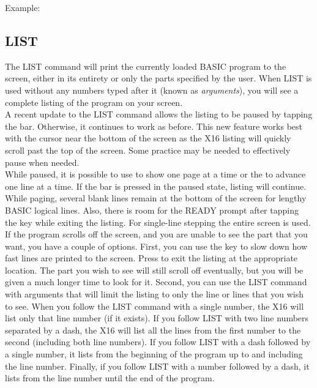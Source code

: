 Example:\\


\subsection{LIST}

The {\ttfamily LIST} command will print the currently loaded BASIC program to
the screen, either in its entirety or only the parts specified by the user.
When {\ttfamily LIST} is used without any numbers typed after it (known as
\emph{arguments}), you will see a complete listing of the program on your
screen.\\

A recent update to the {\ttfamily LIST} command allows the listing to be paused
by tapping the  bar.  Otherwise, it continues to work as before.
This new feature works best with the cursor near the bottom of the screen as
the X16 listing will quickly scroll past the top of the screen.  Some practice
may be needed to effectively pause when needed.\\

While paused, it is possible to use  to show one page at a
time or the  to advance one line at a time.  If the  bar
is pressed in the paused state, listing will continue.  While paging, several
blank lines remain at the bottom of the screen for lengthy BASIC logical
lines.  Also, there is room for the {\ttfamily READY} prompt after tapping
the  key while exiting the listing.  For single-line
stepping the entire screen is used.\\

If the program scrolls off the screen, and you are unable to see the
part that you want, you have a couple of options.  First, you can use the
 key to slow down how fast lines are printed to the screen.  
Press  to exit the listing at the appropriate location.  The
part you wish to see will still scroll off eventually, but you will be given a
much longer time to look for it.  Second, you can use the {\ttfamily LIST}
command with arguments that will limit the listing to only the line or lines
that you wish to see.  When you follow the {\ttfamily LIST} command with a
single number, the X16 will list only that line number (if it exists).  If you
follow {\ttfamily LIST} with two line numbers separated by a dash, the X16 will
list all the lines from the first number to the second (including both line
numbers).  If you follow {\ttfamily LIST} with a dash followed by a single
number, it lists from the beginning of the program up to and including the line
number.  Finally, if you follow {\ttfamily LIST} with a number followed by a
dash, it lists from the line number until the end of the program.\\

